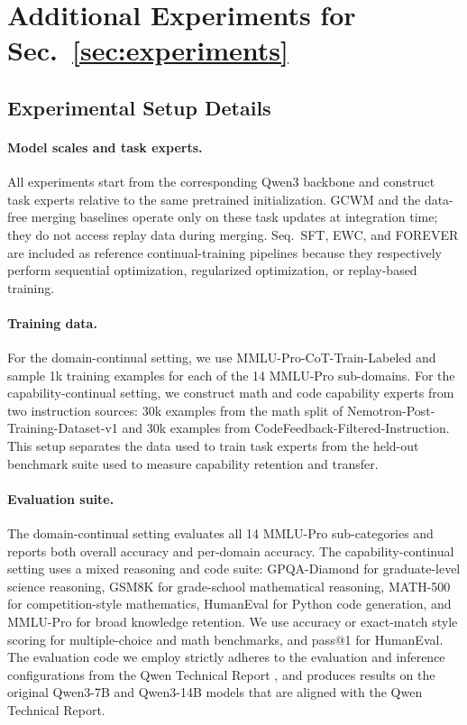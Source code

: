 \documentclass{article}
\begin{document}

\FloatBarrier
\section{Additional Experiments for Sec.~\ref{sec:experiments}}
\label{app:sec5_additional}

\subsection{Experimental Setup Details}
\label{app:exp_setup_details}

\paragraph{Model scales and task experts.}
All experiments start from the corresponding Qwen3 backbone and construct task experts relative to the same pretrained initialization.
GCWM and the data-free merging baselines operate only on these task updates at integration time; they do not access replay data during merging.
Seq.\ SFT, EWC, and FOREVER are included as reference continual-training pipelines because they respectively perform sequential optimization, regularized optimization, or replay-based training.

\paragraph{Training data.}
For the domain-continual setting, we use MMLU-Pro-CoT-Train-Labeled and sample 1k training examples for each of the 14 MMLU-Pro sub-domains.
For the capability-continual setting, we construct math and code capability experts from two instruction sources: 30k examples from the math split of Nemotron-Post-Training-Dataset-v1 and 30k examples from CodeFeedback-Filtered-Instruction.
This setup separates the data used to train task experts from the held-out benchmark suite used to measure capability retention and transfer.

\paragraph{Evaluation suite.}
The domain-continual setting evaluates all 14 MMLU-Pro sub-categories and reports both overall accuracy and per-domain accuracy.
The capability-continual setting uses a mixed reasoning and code suite: GPQA-Diamond for graduate-level science reasoning, GSM8K for grade-school mathematical reasoning, MATH-500 for competition-style mathematics, HumanEval for Python code generation, and MMLU-Pro for broad knowledge retention.
We use accuracy or exact-match style scoring for multiple-choice and math benchmarks, and pass@1 for HumanEval.
{The evaluation code we employ strictly adheres to the evaluation and inference configurations from the Qwen Technical Report \cite{yang2025qwen3}, and produces results on the original Qwen3-7B and Qwen3-14B models that are aligned with the Qwen Technical Report.}
\end{document}
